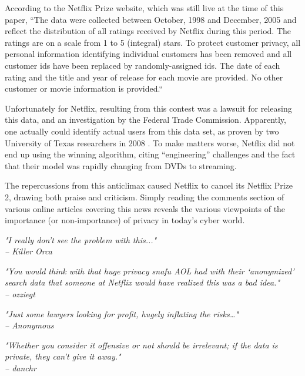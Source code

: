 \documentclass[10pt,journal,compsoc]{IEEEtran}
\begin{document}
According to the Netflix Prize website, which was still live at the time of this paper, “The data were collected between October, 1998 and December, 2005 and reflect the distribution of all ratings received by Netflix during this period. The ratings are on a scale from 1 to 5 (integral) stars. To protect customer privacy, all personal information identifying individual customers has been removed and all customer ids have been replaced by randomly-assigned ids. The date of each rating and the title and year of release for each movie are provided. No other customer or movie information is provided.“
	
Unfortunately for Netflix, resulting from this contest was a lawsuit for releasing this data, and an investigation by the Federal Trade Commission.    Apparently, one actually could identify actual users from this data set, as proven by two University of Texas researchers in 2008 \cite{narayanan}.  To make matters worse, Netflix did not end up using the winning algorithm, citing “engineering” challenges and the fact that their model was rapidly changing from DVDs to streaming\cite{johnston}.

The repercussions from this anticlimax caused Netflix to cancel its Netflix Prize 2, drawing both praise and criticism.  Simply reading the comments section of various online articles covering this news reveals the various viewpoints of the importance (or non-importance) of privacy in today’s cyber world.  

\begin{center}
\textit{"I really don't see the problem with this..." \\– Killer Orca}\cite{anderson}

\vspace{2mm}

\textit{"You would think with that huge privacy snafu AOL had with their ‘anonymized’ search data that someone at Netflix would have realized this was a bad idea." \\– ozziegt}\cite{anderson}

\vspace{2mm}

\textit{"Just some lawyers looking for profit, hugely inflating the risks…" \\– Anonymous}\cite{cheng}

\vspace{2mm}

\textit{"Whether you consider it offensive or not should be irrelevant; if the data is private, they can’t 
give it away." \\– danchr}\cite{ohm}

\end{center}
\end{document}
